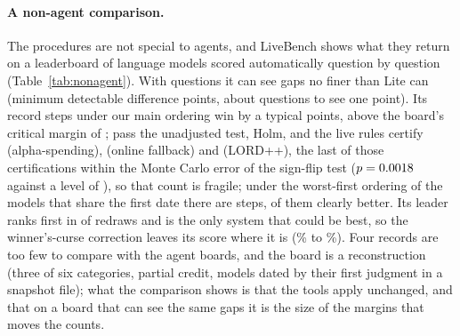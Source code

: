 \documentclass[11pt]{article}
\begin{document}
\paragraph{A non-agent comparison.}
The procedures are not special to agents, and LiveBench shows what they return on a leaderboard of language models scored automatically question by question (Table~\ref{tab:nonagent}).
With \NumLBT{} questions it can see gaps no finer than Lite can (minimum detectable difference \NumLBMDD{} points, about \NumLBTasksOnePt{} questions to see one point).
Its \NumLBSteps{} record steps under our main ordering win by a typical \NumLBMedianMargin{} points, above the board's critical margin of \NumLBCritMargin{}; \NumLBSig{} pass the unadjusted test, \NumLBHolm{} Holm, and the live rules certify \NumLBCertSpend{} (alpha-spending), \NumLBCertFall{} (online fallback) and \NumLBCertLord{} (LORD++), the last of those certifications within the Monte Carlo error of the sign-flip test ($p=0.0018$ against a level of \NumLBMarginLevel), so that count is fragile; under the worst-first ordering of the \NumLBOnFirstDate{} models that share the first date there are \NumLBWorstSteps{} steps, \NumLBWorstSig{} of them clearly better.
Its leader ranks first in \NumLBPBest{} of redraws and is the only system that could be best, so the winner's-curse correction leaves its score where it is (\NumLBWinnerObs\% to \NumLBWinnerAdj\%).
Four records are too few to compare with the agent boards, and the board is a reconstruction (three of six categories, partial credit, models dated by their first judgment in a snapshot file); what the comparison shows is that the tools apply unchanged, and that on a board that can see the same gaps it is the size of the margins that moves the counts.

\begin{table}[t]
\centering\small
\resizebox{\textwidth}{!}{}
\caption{The non-agent comparison. LiveBench (language models) beside the agent board with the longest record chain and the smallest agent board. Certified counts are from the live rules run in date order on the leaderboard baseline.}
\label{tab:nonagent}
\end{table}
\end{document}
